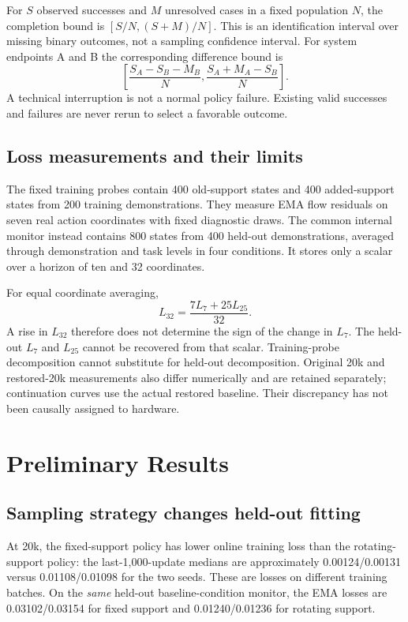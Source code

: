 \documentclass[conference]{IEEEtran}
\begin{document}
For $S$ observed successes and $M$ unresolved cases in a fixed population $N$, the completion bound is $[S/N,(S+M)/N]$. This is an identification interval over missing binary outcomes, not a sampling confidence interval. For system endpoints A and B the corresponding difference bound is
\begin{equation}
\left[\frac{S_A-S_B-M_B}{N},\frac{S_A+M_A-S_B}{N}\right].
\end{equation}
A technical interruption is not a normal policy failure. Existing valid successes and failures are never rerun to select a favorable outcome.

\subsection{Loss measurements and their limits}
The fixed training probes contain 400 old-support states and 400 added-support states from 200 training demonstrations. They measure EMA flow residuals on seven real action coordinates with fixed diagnostic draws. The common internal monitor instead contains 800 states from 400 held-out demonstrations, averaged through demonstration and task levels in four conditions. It stores only a scalar over a horizon of ten and 32 coordinates.

For equal coordinate averaging,
\begin{equation}
L_{32}=\frac{7L_7+25L_{25}}{32}.
\end{equation}
A rise in $L_{32}$ therefore does not determine the sign of the change in $L_7$. The held-out $L_7$ and $L_{25}$ cannot be recovered from that scalar. Training-probe decomposition cannot substitute for held-out decomposition. Original 20k and restored-20k measurements also differ numerically and are retained separately; continuation curves use the actual restored baseline. Their discrepancy has not been causally assigned to hardware.

\section{Preliminary Results}
\subsection{Sampling strategy changes held-out fitting}
At 20k, the fixed-support policy has lower online training loss than the rotating-support policy: the last-1,000-update medians are approximately 0.00124/0.00131 versus 0.01108/0.01098 for the two seeds. These are losses on different training batches. On the \emph{same} held-out baseline-condition monitor, the EMA losses are 0.03102/0.03154 for fixed support and 0.01240/0.01236 for rotating support.
\end{document}
